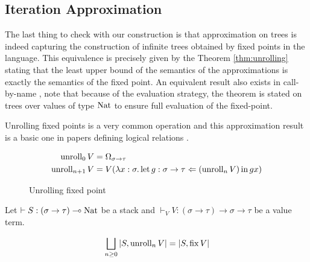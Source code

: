 \subsection{Iteration Approximation}

The last thing to check with our construction is that approximation on trees 
is indeed capturing the construction of infinite trees obtained by fixed points 
in the language. This equivalence 
is precisely given by the Theorem \ref{thm:unrolling} stating that 
the least upper bound of the semantics of the approximations is 
exactly the semantics of the fixed point. An equivalent
result also exists in call-by-name \cite{gom}, note that 
because of the evaluation strategy, the theorem is stated 
on trees over values of type $\Nat$ to ensure full 
evaluation of the fixed-point.

Unrolling fixed points is a very common operation \cite{plotkin2001adequacy}
and this approximation result is a basic one in papers defining logical 
relations \cite{pitts1997operationally} \cite{Pitts2000}.

\begin{figure}[h]
    \begin{align*}
        \Unroll_0 V     &= \Omega_{\sigma \to \tau} \\
        \Unroll_{n+1} V &= 
        V (\lambda x : \sigma. \Bind{(\Unroll_n V)}{g : \sigma \to \tau}{gx})
    \end{align*}
    \caption{Unrolling fixed point}
    \label{fig:unrolling}
\end{figure}

\begin{atheorem}[Unrolling]
    \label{thm:unrolling}
    Let $\vdash S : (\sigma \to \tau) \multimap \Nat$ be a stack and 
    $\vdash_V V : (\sigma \to \tau) \to \sigma \to \tau$ be a 
    value term.

    \begin{equation*}
        \bigsqcup_{n \geq 0} |S, \Unroll_n V| = |S, \Fix V| 
    \end{equation*}
\end{atheorem}

